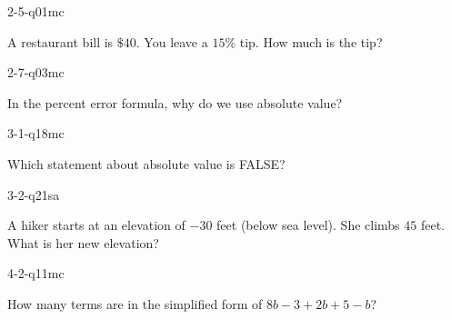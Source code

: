 \begin{practiceQuestion}{2-5-q01}{mc}
\begin{questionText}
A restaurant bill is $\$40$. You leave a $15\%$ tip. How much is the tip?
\end{questionText}
\end{practiceQuestion}

\begin{practiceQuestion}{2-7-q03}{mc}
\begin{questionText}
In the percent error formula, why do we use absolute value?
\end{questionText}
\end{practiceQuestion}

\begin{practiceQuestion}{3-1-q18}{mc}
\begin{questionText}
Which statement about absolute value is FALSE?
\end{questionText}
\end{practiceQuestion}

\begin{practiceQuestion}{3-2-q21}{sa}
\begin{questionText}
A hiker starts at an elevation of $-30$ feet (below sea level). She climbs $45$ feet. What is her new elevation?
\end{questionText}
\end{practiceQuestion}

\begin{practiceQuestion}{4-2-q11}{mc}
\begin{questionText}
How many terms are in the simplified form of $8b - 3 + 2b + 5 - b$?
\end{questionText}
\end{practiceQuestion}

